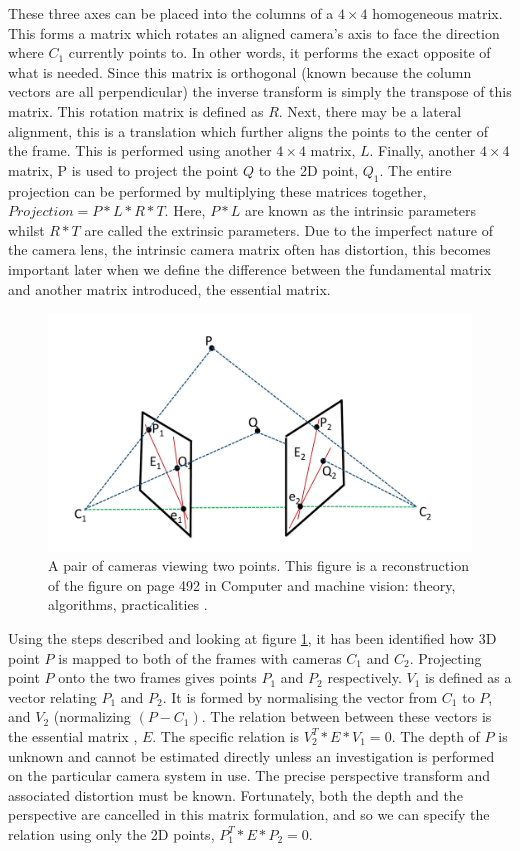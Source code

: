 These three axes can be placed into the columns of a $4 \times 4$ homogeneous matrix. This forms a matrix which rotates an aligned camera's axis to face the direction where $C_1$ currently points to. In other words, it performs the exact opposite of what is needed. Since this matrix is orthogonal (known because the column vectors are all perpendicular) the inverse transform is simply the transpose of this matrix. This rotation matrix is defined as $R$. Next, there may be a lateral alignment, this is a translation which further aligns the points to the center of the frame. This is performed using another $4 \times 4$ matrix, $L$. Finally, another $4 \times 4$ matrix, P is used to project the point $Q$ to the 2D point, $Q_1$. The entire projection can be performed by multiplying these matrices together, $Projection = P * L * R * T$. Here, $P * L$ are known as the intrinsic parameters whilst $R * T$ are called the extrinsic parameters. Due to the imperfect nature of the camera lens, the intrinsic camera matrix often has distortion, this becomes important later when we define the difference between the fundamental matrix and another matrix introduced, the essential matrix.

\begin{figure}[!htb]
	\includegraphics[width=5.0in]{images/introfm1}
	\caption{A pair of cameras viewing two points. This figure is a reconstruction of the figure on page 492 in Computer and machine vision: theory, algorithms, practicalities \cite{Davies12Computer}.}
	\label{fig:INTRO_FMA1}
\end{figure}  

Using the steps described and looking at figure \ref{fig:INTRO_FMA1}, it has been identified how 3D point $P$ is mapped to both of the frames with cameras $C_1$ and $C_2$. Projecting point $P$ onto the two frames gives points $P_1$ and $P_2$ respectively. $V_1$ is defined as a vector relating $P_1$ and $P_2$. It is formed by normalising the vector from $C_1$ to $P$, and $V_2$ (normalizing $(P - C_1)$. The relation between between these vectors is the essential matrix \cite{Davies12Computer}, $E$. The specific relation is $V_2^{T} * E * V_1 = 0$. The depth of $P$ is unknown and cannot be estimated directly unless an investigation is performed on the particular camera system in use. The precise perspective transform and associated distortion must be known. Fortunately, both the depth and the perspective are cancelled in this matrix formulation, and so we can specify the relation using only the 2D points, $P_1^T * E * P_2 = 0$. \\

